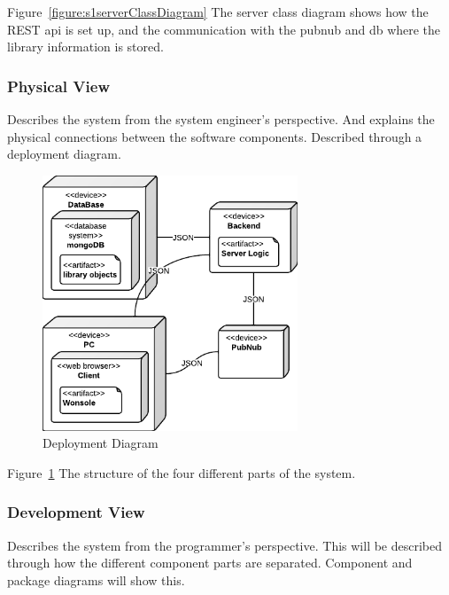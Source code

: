 Figure~\ref{figure:s1serverClassDiagram} The server class diagram shows how the REST api is set up, and the communication with the pubnub and db where the library information is stored.






\subsubsection{Physical View}
Describes the system from the system engineer's perspective. And explains the physical connections between the software components. Described through a deployment diagram. 

\begin{figure}[h]
\centering
\includegraphics[width=3in]{image/architecture/s1/s1DeploymentDiagram.png}
\caption{Deployment Diagram}
\label{figure:s1DeploymentDiagram}
\end{figure}

Figure~\ref{figure:s1DeploymentDiagram} The structure of the four different parts of the system.

\subsubsection{Development View}
Describes the system from the programmer's perspective. This will be described through how the different component parts are separated. Component and package diagrams will show this.

